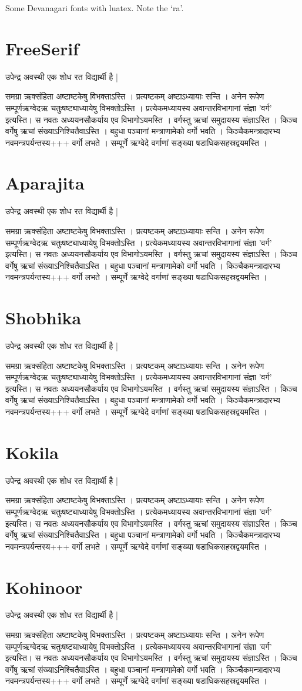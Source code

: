 \documentclass{article}
\newcommand\text{उपेन्द्र अवस्थी एक शोध रत विद्यार्थी है |%
\vskip3mm

समग्रा ऋक्संहिता अष्टाष्टकेषु विभक्ताऽस्ति । प्रत्यष्टकम् अष्टाऽध्यायाः
सन्ति । अनेन रूपेण सम्पूर्णऋग्वेदऋ चतुःषष्ट्याध्यायेषु विभक्तोऽस्ति ।
प्रत्येकमध्यायस्य अवान्तरविभागानां संज्ञा 'वर्ग' इत्यस्ति। स नवतः
अध्ययनसौकर्याय एव विभागोऽयमस्ति । वर्गस्तु ऋचां समुदायस्य संज्ञाऽस्ति ।
किञ्च वर्गेषु ऋचां संख्याऽनिश्चितैवाऽस्ति । बहुधा पञ्चानां
मन्त्राणामेको वर्गो भवति । किञ्चैकमन्त्रादारभ्य नवमन्त्रपर्यन्तस्य+++
वर्गो लभते । सम्पूर्णे ऋग्वेदे वर्गाणां सङ्ख्या षडाधिकसहस्रद्वयमस्ति ।}
\begin{document}
\raggedright

Some Devanagari fonts with luatex. Note the ‘ra’.

\section{FreeSerif}\fsfamily\text

\section{Aparajita}\apfamily\text

\section{Shobhika}\sbfamily\text

\section{Kokila}\kkfamily\text

\section{Kohinoor}\khfamily\text
\end{document}
